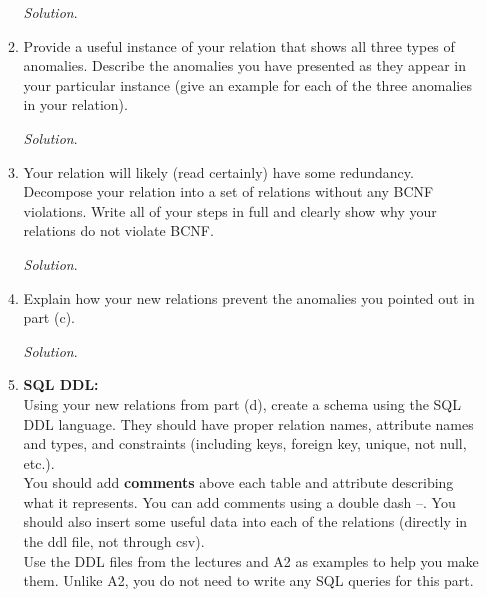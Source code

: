 \documentclass[10pt]{article}
\begin{document}
\begin{enumerate}
\begin{enumerate}
        \begin{mdframed}[leftmargin=-6.5mm]
        \textit{Solution}.\\
        \end{mdframed}
        
        \item Provide a useful instance of your relation that shows all three types of anomalies. Describe the anomalies you have presented as they appear in your particular instance (give an example for each of the three anomalies in your relation).
        
        \begin{mdframed}[leftmargin=-6.5mm]
        \textit{Solution}.\\
        \end{mdframed}
        
        \item Your relation will likely (read certainly) have some redundancy. Decompose your relation into a set of relations without any BCNF violations. Write all of your steps in full and clearly show why your relations do not violate BCNF.
        
        \begin{mdframed}[leftmargin=-6.5mm]
        \textit{Solution}.\\
        \end{mdframed}
        
        \item Explain how your new relations prevent the anomalies you pointed out in part (c).
        
        \begin{mdframed}[leftmargin=-6.5mm]
        \textit{Solution}.\\
        \end{mdframed}
        
        \item \textbf{SQL DDL:}\\
        Using your new relations from part (d), create a schema using the SQL DDL language. They should have proper relation names, attribute names and types, and constraints (including keys, foreign key, unique, not null, etc.).\\
        You should add \textbf{comments} above each table and attribute describing what it represents. You can add comments using a double dash --. You should also insert some useful data into each of the relations (directly in the ddl file, not through csv).\\
        Use the DDL files from the lectures and A2 as examples to help you make them. Unlike A2, you do not need to write any SQL queries for this part.
        

\end{enumerate}
\end{enumerate}
\end{document}
